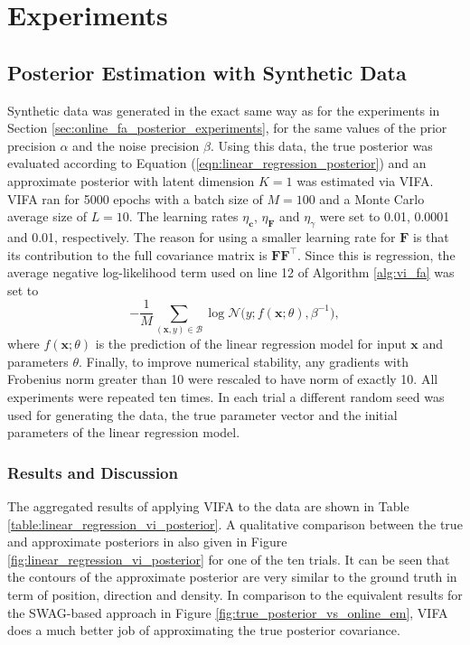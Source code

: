 \documentclass[msc,deptreport.inf]{infthesis} %
\newcommand{\matr}[1]{\mathbf{#1}}
\begin{document}
\section{Experiments}

\subsection{Posterior Estimation with Synthetic Data}\label{sec:vifa_posterior_synthetic}

Synthetic data was generated in the exact same way as for the experiments in Section \ref{sec:online_fa_posterior_experiments}, for the same values of the prior precision $\alpha$ and the noise precision $\beta$. Using this data, the true posterior was evaluated according to Equation (\ref{eqn:linear_regression_posterior}) and an approximate posterior with latent dimension $K=1$ was estimated via VIFA. VIFA ran for 5000 epochs with a batch size of $M=100$ and a Monte Carlo average size of $L=10$.  The learning rates $\eta_\matr{c}$,  $\eta_\matr{F}$ and $\eta_\gamma$ were set to 0.01, 0.0001 and 0.01, respectively. The reason for using a smaller learning rate for $\matr{F}$ is that its contribution to the full covariance matrix is $\matr{F}\matr{F}^\intercal$. Since this is regression, the average negative log-likelihood term used on line 12 of Algorithm \ref{alg:vi_fa} was set to
\begin{equation}\label{eqn:vifa_log_likelihood_term}
	-\frac{1}{M} \sum_{(\matr{x}, y) \in \mathcal{B}} \log \mathcal{N}\big(y; f(\matr{x}; \theta), \beta^{-1}\big),
\end{equation}
where $f(\matr{x}; \theta)$ is the prediction of the linear regression model for input $\matr{x}$ and parameters $\theta$. Finally, to improve numerical stability, any gradients with Frobenius norm greater than 10 were rescaled to have norm of exactly 10. All experiments were repeated ten times. In each trial a different random seed was used for generating the data, the true parameter vector and the initial parameters of the linear regression model. 

\subsubsection{Results and Discussion}

The aggregated results of applying VIFA to the data are shown in Table \ref{table:linear_regression_vi_posterior}. A qualitative comparison between the true and approximate posteriors in also given in Figure \ref{fig:linear_regression_vi_posterior} for one of the ten trials. It can be seen that the contours of the approximate posterior are very similar to the ground truth in term of position, direction and density. In comparison to the equivalent results for the SWAG-based approach in Figure \ref{fig:true_posterior_vs_online_em}, VIFA does a much better job of approximating the true posterior covariance.
\end{document}
